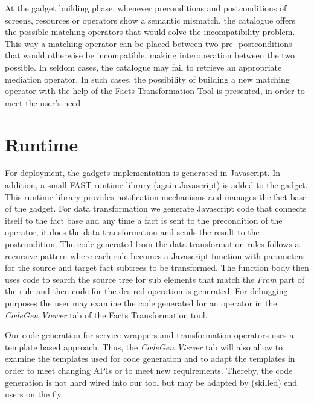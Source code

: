 At the gadget building phase, whenever preconditions and postconditions of screens, resources or operators show a semantic mismatch, the catalogue offers the possible matching operators that would solve the incompatibility problem. This way a matching operator can be placed between two pre- postconditions that would otherwise be incompatible, making interoperation between the two possible. In seldom cases, the catalogue may fail to retrieve an appropriate mediation operator. In such cases, the possibility of building a new matching operator with the help of the Facts Transformation Tool is presented, in order to meet the user's need.  

\section{Runtime} 
\label{sec:runtime}
For deployment, the gadgets implementation is generated in Javascript. In addition, a small FAST runtime library (again Javascript) is added to the gadget. This runtime library provides notification mechanisms and manages the fact base of the gadget. For data transformation we generate Javascript code that connects itself to the fact base and any time a fact is sent to the precondition of the operator, it does the data transformation and sends the result to the postcondition. The code generated from the data transformation rules follows a recursive pattern where each rule becomes a Javascript function with parameters for the source and target fact subtrees to be transformed. The function body then uses code to search the source tree for sub elements that match the \textit{From} part of the rule and then code for the desired operation is generated. For debugging purposes the user may examine the code generated for an operator in the \textit{CodeGen Viewer} tab of the Facts Transformation tool. 

Our code generation for service wrappers and transformation operators uses a template based approach. Thus, the \textit{CodeGen Viewer} tab will also allow to examine the templates used for code generation and to adapt the templates in order to meet changing APIs or to meet new requirements. Thereby, the code generation is not hard wired into our tool but may be adapted by (skilled) end users on the fly. 

